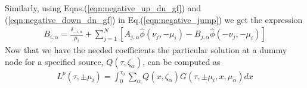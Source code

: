 \documentclass[11pt]{article}
\newcommand{\eqr}[1]{Eq.\thinspace(#1)}
\begin{document}
Similarly, using Eqns.\thinspace(\ref{eqn:negative_up_dn_gf}) and
(\ref{eqn:negative_down_dn_gf}) in \eqr{\ref{eqn:negative_jump}} we
get the expression
\begin{align}
  B_{i,\alpha} =
  \frac{\delta_{-i,\alpha}}{\mu_i}
  +
  \sum_{j=1}^N
  \left[
     A_{j,\alpha} \hat{\phi}(\nu_j,-\mu_i)
    - B_{j,\alpha} \hat{\phi}(-\nu_j,-\mu_i)
 \right]
\end{align}
Now that we have the needed coefficients the particular solution at a
dummy node for a specified source, $Q(\tau,\zeta_\alpha)$, can be
computed as
\begin{align}
  L^p(\tau,\pm\mu_i) = \int_0^{\tau_0}
  \sum_\alpha
  Q(x,\zeta_\alpha)
  G(\tau,\pm\mu_i,x,\mu_\alpha)
  dx
\end{align}
\end{document}
